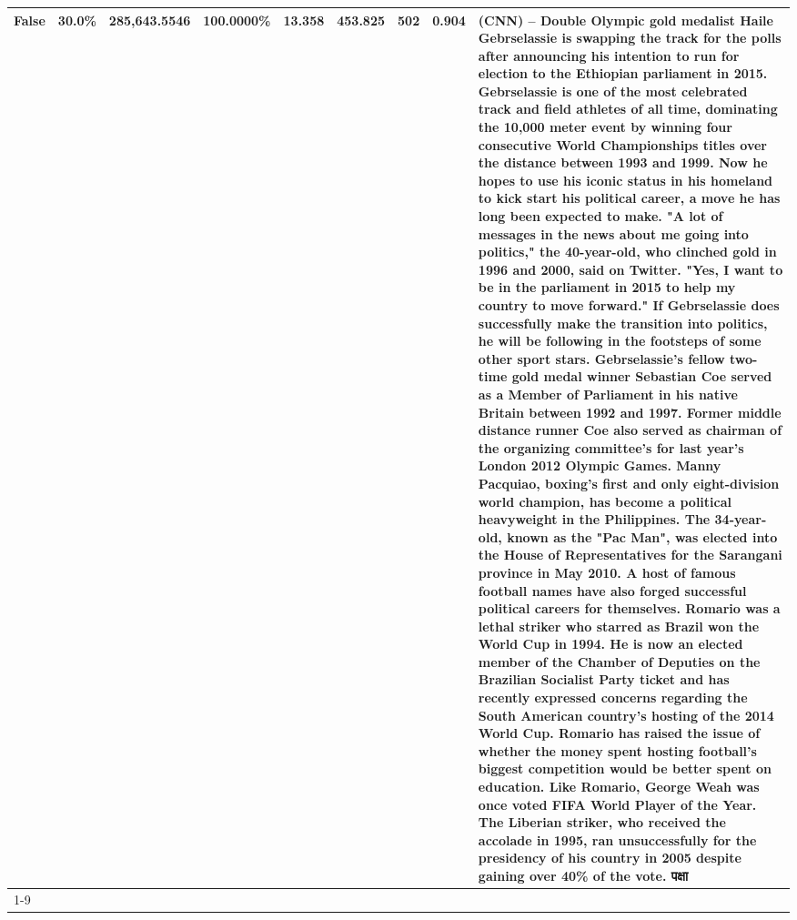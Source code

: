 \begin{table}[H]
{\begin{tabular}{lllrlllll}
False & 30.0\% & 285,643.5546 & \bfseries \color{red} 100.0000\% & 13.358 & 453.825 & 502 & 0.904 & (CNN) -- Double Olympic gold medalist Haile Gebrselassie is swapping the track for the polls after announcing his intention to run for election to the Ethiopian parliament in 2015. Gebrselassie is one of the most celebrated track and field athletes of all time, dominating the 10,000 meter event by winning four consecutive World Championships titles over the distance between 1993 and 1999. Now he hopes to use his iconic status in his homeland to kick start his political career, a move he has long been expected to make. "A lot of messages in the news about me going into politics," the 40-year-old, who clinched gold in 1996 and 2000, said on Twitter. "Yes, I want to be in the parliament in 2015 to help my country to move forward." If Gebrselassie does successfully make the transition into politics, he will be following in the footsteps of some other sport stars. Gebrselassie's fellow two-time gold medal winner Sebastian Coe served as a Member of Parliament in his native Britain between 1992 and 1997. Former middle distance runner Coe also served as chairman of the organizing committee's for last year's London 2012 Olympic Games. Manny Pacquiao, boxing's first and only eight-division world champion, has become a political heavyweight in the Philippines. The 34-year-old, known as the "Pac Man", was elected into the House of Representatives for the Sarangani province in May 2010. A host of famous football names have also forged successful political careers for themselves. Romario was a lethal striker who starred as Brazil won the World Cup in 1994. He is now an elected member of the Chamber of Deputies on the Brazilian Socialist Party ticket and has recently expressed concerns regarding the South American country's hosting of the 2014 World Cup. Romario has raised the issue of whether the money spent hosting football's biggest competition would be better spent on education. Like Romario, George Weah was once voted FIFA World Player of the Year. The Liberian striker, who received the accolade in 1995, ran unsuccessfully for the presidency of his country in 2005 despite gaining over 40\% of the vote. पक्षा \\
\cline{1-9}

\end{tabular}}
\end{table}
